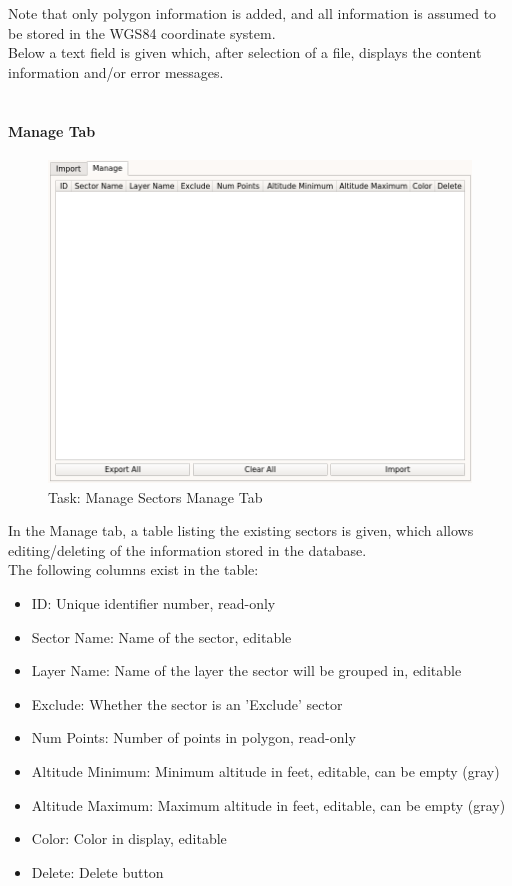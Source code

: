 Note that only polygon information is added, and all information is assumed to be stored in the WGS84 coordinate system. \\

Below a text field is given which, after selection of a file, displays the content information and/or error messages. \\\

\paragraph {Manage Tab}

\begin{figure}[H]
    \includegraphics[width=16cm,frame]{../screenshots/manage_sectors_manage.png}
  \caption{Task: Manage Sectors Manage Tab}
\end{figure}

In the Manage tab, a table listing the existing sectors is given, which allows editing/deleting of the information stored in the database. \\

The following columns exist in the table:
\begin{itemize}  
\item ID: Unique identifier number, read-only
\item Sector Name: Name of the sector, editable
\item Layer Name: Name of the layer the sector will be grouped in, editable
\item Exclude: Whether the sector is an 'Exclude' sector
\item Num Points: Number of points in polygon, read-only
\item Altitude Minimum: Minimum altitude in feet, editable, can be empty (gray)
\item Altitude Maximum: Maximum altitude in feet, editable, can be empty (gray)
\item Color: Color in display, editable
\item Delete: Delete button
\end{itemize}
\ \\


